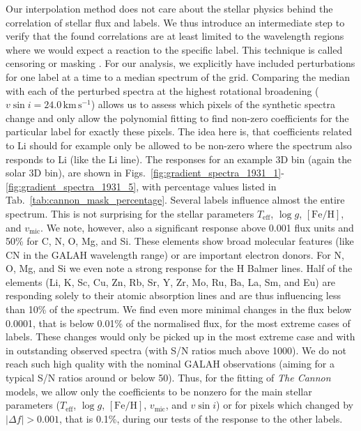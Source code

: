 \documentclass[
  journal=pasa,
  manuscript=research-paper, %
  year=2021,
  volume=37,
]{cup-journal}
\newcommand{\Teff}{$T_\mathrm{eff}$\xspace}
\newcommand{\logg}{$\log g$\xspace}
\newcommand{\feh}{$\mathrm{[Fe/H]}$\xspace}
\newcommand{\vmic}{$v_\mathrm{mic}$\xspace}
\newcommand{\vsini}{$v \sin i$\xspace}
\newcommand{\TheCannon}{\textit{The Cannon}\xspace}
\newcommand{\kms}{\,\mathrm{km\,s^{-1}}}	%
\begin{document}
Our interpolation method does not care about the stellar physics behind the correlation of stellar flux and labels. We thus introduce an intermediate step to verify that the found correlations are at least limited to the wavelength regions where we would expect a reaction to the specific label. This technique is called censoring \citep{Casey2016} or masking \citep{Buder2018}. For our analysis, we explicitly have included perturbations for one label at a time to a median spectrum of the grid. Comparing the median with each of the perturbed spectra at the highest rotational broadening ($v \sin i = 24.0\kms$) allows us to assess which pixels of the synthetic spectra change and only allow the polynomial fitting to find non-zero coefficients for the particular label for exactly these pixels. The idea here is, that coefficients related to Li should for example only be allowed to be non-zero where the spectrum also responds to Li (like the Li line). The responses for an example 3D bin (again the solar 3D bin), are shown in Figs.~\ref{fig:gradient_spectra_1931_1}-\ref{fig:gradient_spectra_1931_5}, with percentage values listed in Tab.~\ref{tab:cannon_mask_percentage}. Several labels influence almost the entire spectrum. This is not surprising for the stellar parameters \Teff, \logg, \feh, and \vmic. We note, however, also a significant response above 0.001 flux units and 50\% for C, N, O, Mg, and Si. These elements show broad molecular features (like CN in the GALAH wavelength range) or are important electron donors. For N, O, Mg, and Si we even note a strong response for the H Balmer lines. Half of the elements (Li, K, Sc, Cu, Zn, Rb, Sr, Y, Zr, Mo, Ru, Ba, La, Sm, and Eu) are responding solely to their atomic absorption lines and are thus influencing less than 10\% of the spectrum. We find even more minimal changes in the flux below 0.0001, that is below 0.01\% of the normalised flux, for the most extreme cases of labels. These changes would only be picked up in the most extreme case and with in outstanding observed spectra (with S/N ratios much above 1000). We do not reach such high quality with the nominal GALAH observations (aiming for a typical S/N ratios around or below 50). Thus, for the fitting of \TheCannon models, we allow only the coefficients to be nonzero for the main stellar parameters (\Teff, \logg, \feh, \vmic, and \vsini) or for pixels which changed by $\vert \Delta f \vert > 0.001$, that is 0.1\%, during our tests of the response to the other labels.


\end{document}
